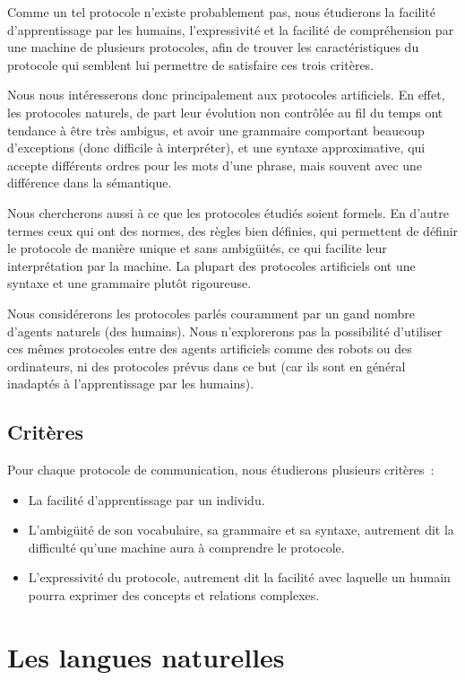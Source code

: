 \documentclass[french,a4paper]{article}
\begin{document}
Comme un tel protocole n'existe probablement pas, nous étudierons la
facilité d'apprentissage par les humains, l'expressivité et la
facilité de compréhension par une machine de plusieurs protocoles,
afin de trouver les caractéristiques du protocole qui semblent lui
permettre de satisfaire ces trois critères.

Nous nous intéresserons donc principalement aux protocoles
artificiels. En effet, les protocoles naturels, de part leur évolution
non contrôlée au fil du temps ont tendance à être très ambigus, et
avoir une grammaire comportant beaucoup d'exceptions (donc difficile à
interpréter), et une syntaxe approximative, qui accepte différents
ordres pour les mots d'une phrase, mais souvent avec une différence
dans la sémantique.

Nous chercherons aussi à ce que les protocoles étudiés soient
formels. En d'autre termes ceux qui ont des normes, des règles bien
définies, qui permettent de définir le protocole de manière unique et
sans ambigüités, ce qui facilite leur interprétation par la
machine. La plupart des protocoles artificiels ont une syntaxe et une
grammaire plutôt rigoureuse.

Nous considérerons les protocoles parlés couramment par un gand nombre
d'agents naturels (des humains). Nous n'explorerons pas la possibilité
d'utiliser ces mêmes protocoles entre des agents artificiels comme des
robots ou des ordinateurs, ni des protocoles prévus dans ce but (car
ils sont en général inadaptés à l'apprentissage par les humains).

\subsection{Critères}
Pour chaque protocole de communication, nous étudierons plusieurs critères~:
\begin{itemize}
\item La facilité d'apprentissage par un individu.
\item L'ambigüité de son vocabulaire, sa grammaire et sa syntaxe,
  autrement dit la difficulté qu'une machine aura à comprendre le
  protocole.
\item L'expressivité du protocole, autrement dit la facilité avec
  laquelle un humain pourra exprimer des concepts et relations
  complexes.
\end{itemize}

\section{Les langues naturelles}
\end{document}
